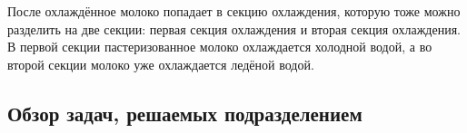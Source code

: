 {  \par \redline После охлаждённое молоко попадает в секцию охлаждения, которую тоже можно разделить на две секции: первая секция охлаждения и вторая секция охлаждения. В первой секции пастеризованное молоко охлаждается холодной водой, а во второй секции молоко уже охлаждается ледёной водой. 

  \par 
}

\subtitlespace

\subsection*{  
  \gostTitleFont
   Обзор задач, решаемых подразделением
} 

\subtitlespace

